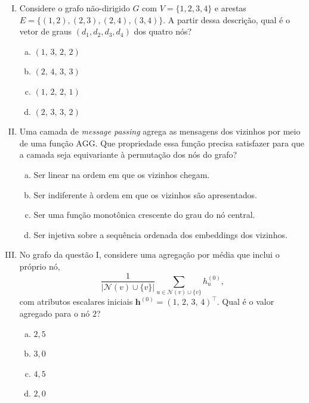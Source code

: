 \documentclass{dlproblemset}
\begin{document}
\begin{enumerate}[I)]

    \item Considere o grafo não-dirigido $G$ com $V = \{1,2,3,4\}$ e arestas $E = \{(1,2),(2,3),(2,4),(3,4)\}$. A partir dessa descrição, qual é o vetor de graus $(d_1, d_2, d_3, d_4)$ dos quatro nós?
    \begin{enumerate}[(a)]
        \item $(1,\, 3,\, 2,\, 2)$
        \item $(2,\, 4,\, 3,\, 3)$
        \item $(1,\, 2,\, 2,\, 1)$
        \item $(2,\, 3,\, 3,\, 2)$
    \end{enumerate}

    \item Uma camada de \textit{message passing} agrega as mensagens dos vizinhos por meio de uma função $\mathrm{AGG}$. Que propriedade essa função precisa satisfazer para que a camada seja equivariante à permutação dos nós do grafo?
    \begin{enumerate}[(a)]
        \item Ser linear na ordem em que os vizinhos chegam.
        \item Ser indiferente à ordem em que os vizinhos são apresentados.
        \item Ser uma função monotônica crescente do grau do nó central.
        \item Ser injetiva sobre a sequência ordenada dos embeddings dos vizinhos.
    \end{enumerate}

    \item No grafo da questão I, considere uma agregação por média que inclui o próprio nó,
    \[
        \frac{1}{|\mathcal{N}(v) \cup \{v\}|}\sum_{u \in \mathcal{N}(v) \cup \{v\}} h^{(0)}_u,
    \]
    com atributos escalares iniciais $\mathbf{h}^{(0)} = (1,\, 2,\, 3,\, 4)^\top$. Qual é o valor agregado para o nó $2$?
    \begin{enumerate}[(a)]
        \item $2{,}5$
        \item $3{,}0$
        \item $4{,}5$
        \item $2{,}0$
    \end{enumerate}


\end{enumerate}
\end{document}
